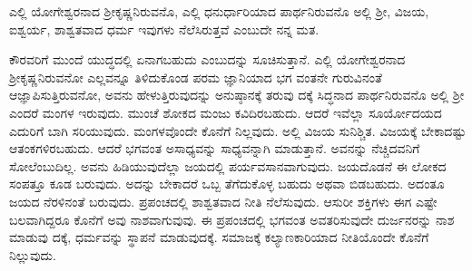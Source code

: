 {\small ಎಲ್ಲಿ ಯೋಗೇಶ್ವರನಾದ ಶ‍್ರೀಕೃಷ್ಣನಿರುವನೊ, ಎಲ್ಲಿ ಧನುರ್ಧಾರಿಯಾದ ಪಾರ್ಥನಿರುವನೊ ಅಲ್ಲಿ ಶ‍್ರೀ, ವಿಜಯ, ಐಶ್ವರ್ಯ, ಶಾಶ್ವತವಾದ ಧರ್ಮ ಇವುಗಳು ನೆಲೆಸಿರುತ್ತವೆ ಎಂಬುದೇ ನನ್ನ ಮತ.}

ಕೌರವರಿಗೆ ಮುಂದೆ ಯುದ್ಧದಲ್ಲಿ ಏನಾಗಬಹುದು ಎಂಬುದನ್ನು ಸೂಚಿಸುತ್ತಾನೆ. ಎಲ್ಲಿ ಯೋಗೇಶ್ವರನಾದ ಶ‍್ರೀಕೃಷ್ಣನಿರುವನೋ ಎಲ್ಲವನ್ನೂ ತಿಳಿದುಕೊಂಡ ಪರಮ ಜ್ಞಾನಿಯಾದ ಭಗ ವಂತನೇ ಗುರುವಿನಂತೆ ಆಜ್ಞಾಪಿಸುತ್ತಿರುವನೋ, ಅವನು ಹೇಳುತ್ತಿರುವುದನ್ನು ಅನುಷ್ಠಾನಕ್ಕೆ ತರುವು ದಕ್ಕೆ ಸಿದ್ಧನಾದ ಪಾರ್ಥನಿರುವನೊ ಅಲ್ಲಿ ಶ‍್ರೀ ಎಂದರೆ ಮಂಗಳ ಇರುವುದು. ಮುಂಚೆ ಶೋಕದ ಮಂಜು ಕವಿದಿರಬಹುದು. ಆದರೆ ಇವೆಲ್ಲಾ ಸೂರ್ಯೋದಯದ ಎದುರಿಗೆ ಬಾಗಿ ಸರಿಯುವುದು. ಮಂಗಳವೊಂದೇ ಕೊನೆಗೆ ನಿಲ್ಲವುದು. ಅಲ್ಲಿ ವಿಜಯ ಸುನಿಶ್ಚಿತ. ವಿಜಯಕ್ಕೆ ಬೇಕಾದಷ್ಟು ಆತಂಕಗಳಿರಬಹುದು. ಆದರೆ ಭಗವಂತ ಅಸಾಧ್ಯವನ್ನು ಸಾಧ್ಯವನ್ನಾಗಿ ಮಾಡುತ್ತಾನೆ. ಅವನನ್ನು ನೆಚ್ಚಿದವನಿಗೆ ಸೋಲೆಂಬುದಿಲ್ಲ. ಅವನು ಹಿಡಿಯುವುದೆಲ್ಲಾ ಜಯದಲ್ಲಿ ಪರ್ಯವಸಾನವಾಗುವುದು. ಜಯದೊಡನೆ ಈ ಲೋಕದ ಸಂಪತ್ತೂ ಕೂಡ ಬರುವುದು. ಅದನ್ನು ಬೇಕಾದರೆ ಒಬ್ಬ ತೆಗೆದುಕೊಳ್ಳ ಬಹುದು ಅಥವಾ ಬಿಡಬಹುದು. ಅದಂತೂ ಜಯದ ನೆರಳಿನಂತೆ ಬರುವುದು. ಪ್ರಪಂಚದಲ್ಲಿ ಶಾಶ್ವತವಾದ ನೀತಿ ನೆಲೆಸುವುದು. ಆಸುರೀ ಶಕ್ತಿಗಳು ಈಗ ಎಷ್ಟೇ ಬಲವಾಗಿದ್ದರೂ ಕೊನೆಗೆ ಅವು ನಾಶವಾಗುವುವು. ಈ ಪ್ರಪಂಚದಲ್ಲಿ ಭಗವಂತ ಅವತರಿಸುವುದೇ ದುರ್ಜನರನ್ನು ನಾಶ ಮಾಡುವು ದಕ್ಕೆ, ಧರ್ಮವನ್ನು ಸ್ಥಾಪನೆ ಮಾಡುವುದಕ್ಕೆ. ಸಮಾಜಕ್ಕೆ ಕಲ್ಯಾಣಕಾರಿಯಾದ ನೀತಿಯೊಂದೇ ಕೊನೆಗೆ ನಿಲ್ಲುವುದು.

